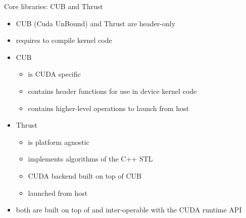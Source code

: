 \documentclass[aspectratio=43]{beamer}
\begin{document}
\begin{frame}[fragile]{Core libraries: CUB and Thrust}

    \begin{itemize}
        \item CUB (Cuda UnBound) and Thrust are header-only
        \item requires  to compile kernel code
        \item CUB
        \begin{itemize}
            \item is CUDA specific
            \item contains header functions for use in device kernel code
            \item contains higher-level operations to launch from host
        \end{itemize}
        \item Thrust
        \begin{itemize}
            \item is platform agnostic
            \item implements algorithms of the C++ STL
            \item CUDA backend built on top of CUB
            \item launched from host
        \end{itemize}
        \item both are built on top of and inter-operable with the CUDA runtime API
    \end{itemize}

\end{frame}
\end{document}
